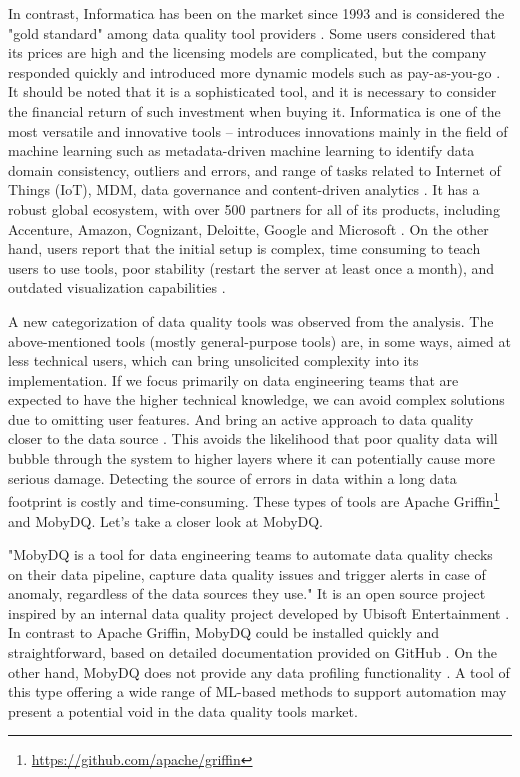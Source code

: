      		In contrast, Informatica has been on the market since 1993 and is considered the "gold standard" among data quality tool providers \cite{Chien2019}. Some users considered that its prices are high and the licensing models are complicated, but the company responded quickly and introduced more dynamic models such as pay-as-you-go \cite{Chien2019}. It should be noted that it is a sophisticated tool, and it is necessary to consider the financial return of such investment when buying it. Informatica is one of the most versatile and innovative tools -- introduces innovations mainly in the field of machine learning such as metadata-driven machine learning to identify data domain consistency, outliers and errors, and range of tasks related to Internet of Things (IoT), MDM, data governance and content-driven analytics \cite{Chien2019}. It has a robust global ecosystem, with over 500 partners for all of its products, including Accenture, Amazon, Cognizant, Deloitte, Google and Microsoft \cite{Chien2019}. On the other hand, users report that the initial setup is complex, time consuming to teach users to use tools, poor stability (restart the server at least once a month), and outdated visualization capabilities \cite{Chien2019}.
      		
      		
			A new categorization of data quality tools was observed from the analysis. The above-mentioned tools (mostly general-purpose tools) are, in some ways, aimed at less technical users, which can bring unsolicited complexity into its implementation. If we focus primarily on data engineering teams that are expected to have the higher technical knowledge, we can avoid complex solutions due to omitting user features. And bring an active approach to data quality closer to the data source \cite{McDaniel2019}. This avoids the likelihood that poor quality data will bubble through the system to higher layers where it can potentially cause more serious damage. Detecting the source of errors in data within a long data footprint is costly and time-consuming. These types of tools are Apache Griffin\footnote{\url{https://github.com/apache/griffin}} and MobyDQ. Let's take a closer look at MobyDQ.	      
      
			"MobyDQ is a tool for data engineering teams to automate data quality checks on their data pipeline, capture data quality issues and trigger alerts in case of anomaly, regardless of the data sources they use." \cite{Rolland2020}  It is an open source project inspired by an internal data quality project developed by Ubisoft Entertainment \cite{Rolland2020}. In contrast to Apache Griffin, MobyDQ could be installed quickly and straightforward, based on detailed documentation provided on GitHub \cite{Ehrlinger2019}. On the other hand, MobyDQ does not provide any data profiling functionality \cite{Rolland2020}. A tool of this type offering a wide range of ML-based methods to support automation may present a potential void in the data quality tools market. 
			